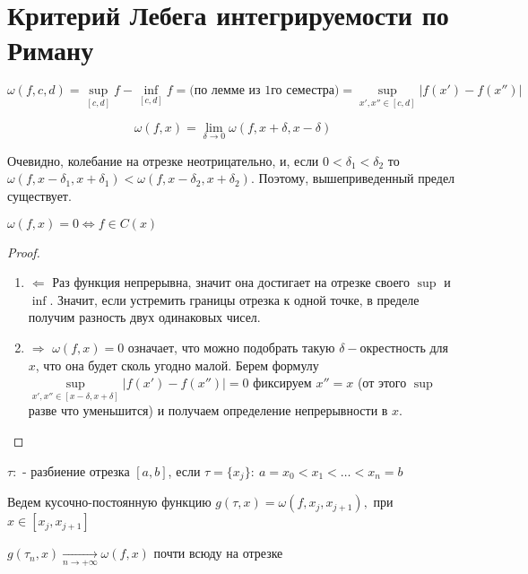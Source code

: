 \section{Критерий Лебега интегрируемости по Риману}

\begin{definition}
	\[ \omega(f, c, d) = \sup\limits_{[c, d]} f - \inf\limits_{[c, d]} f =  \text{(по лемме из 1го семестра)}  = \sup\limits_{x',x'' \in [c,d]} | f(x') - f(x'') |\]
\end{definition}

\begin{definition}
	\[ \omega(f, x) = \lim\limits_{\delta \rightarrow 0} \omega(f, x + \delta, x - \delta)\]
\end{definition}

Очевидно, колебание на отрезке неотрицательно, и, если $0 < \delta_1 < \delta_2$ то $\omega(f, x - \delta_1, x + \delta_1) < \omega(f, x - \delta_2, x + \delta_2)$.
Поэтому, вышеприведенный предел существует.

\begin{statement}
$\omega(f, x) = 0 \Leftrightarrow f \in C(x)$
\end{statement}

\begin{proof}
	\begin{enumerate}
		\item $\Leftarrow$ Раз функция непрерывна, значит она достигает на отрезке своего $\sup$ и $\inf$. Значит, если устремить границы отрезка к одной точке, в пределе получим разность двух одинаковых чисел.
		\item $\Rightarrow$ $\omega(f, x) = 0$ означает, что можно подобрать такую $\delta-$окрестность для $x$, что она будет сколь угодно малой. Берем формулу $\sup\limits_{x',x'' \in [x - \delta,x + \delta]} | f(x') - f(x'') | = 0$ фиксируем $x'' = x$ (от этого $\sup$ разве что уменьшится) и получаем определение непрерывности в $x$.
	\end{enumerate}
\end{proof}

\begin{definition}
$\tau:$ - разбиение отрезка $[a, b]$, если $\tau = \{x_j\}: \: a = x_0 < x_1 < \dots < x_n = b$
\end{definition}

Ведем кусочно-постоянную функцию $g(\tau, x) = \omega(f, x_j, x_{j + 1}),$ при $x \in [x_j, x_{j + 1}]$

\begin{statement}
$g(\tau_n, x) \xrightarrow[n \rightarrow +\infty]{} \omega(f, x)$ почти всюду на отрезке
\end{statement}


